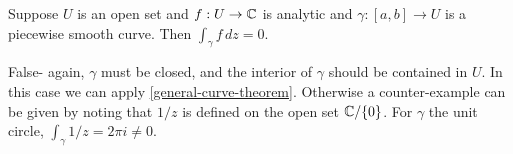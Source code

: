 \documentclass{homework}
\begin{document}
                                                                                                                                                       \begin{problem}
                                                                                                                                                         Suppose $U$ is an open set and $f : U \to \mathbb{C}$ is analytic and
                                                                                                                                                           $\gamma : [a,b] \to U$ is a piecewise smooth curve.  Then
                                                                                                                                                             $\displaystyle\int_\gamma f \, dz = 0$.
                                                                                                                                                             \end{problem}
                                                                                                                                                             \begin{solution}
                                                                                                                                                             False- again, $\gamma$ must be closed, and the interior of $\gamma$ should be contained in $U$. In this case we can apply \ref{general-curve-theorem}.
                                                                                                                                                             Otherwise a counter-example can be given by noting that $1/z$ is defined on the open set $\mathbb{C}/\{0\}$. For $\gamma$ the unit circle, $\int_\gamma 1/z=2\pi i\neq 0$.
                                                                                                                                                             \end{solution}
\end{document}
